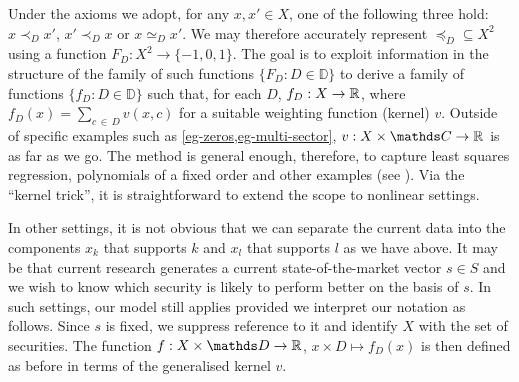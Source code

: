 \documentclass[12pt,a4paper,twoside]{article}
\newcommand{\preceqb}{\mathbin{\preceq}}
\newcommand{\mbbd}{{\mathds D}}
\newcommand{\mbbc}{{\mathds C}}
\begin{document}

Under the axioms we adopt, for any $x, x' \in X$, one of the following three
hold: $x \prec_D x'$, $x' \prec_D x$ or $x \simeq_D x'$. We may therefore
accurately represent $\preceqb_D \subseteq X^2$ using a function $F_D: X^2
\rightarrow \{-1, 0, 1\}$. The goal is to exploit information in the structure
of the family of such functions $\{F_D: D \in \mbbd\}$ to derive a family of
functions $\{f_D: D \in \mbbd\}$ such that, for each $D$, $f_D: X \rightarrow
\mathbb R$, where $f_D(x) = \sum_{c\, \in \,D} v(x, c)$ for a suitable weighting
function (kernel) $v$. Outside of specific examples such as
\cref{eg-zeros,eg-multi-sector}, $v: X \times \mbbc \rightarrow \R$ is as far
as we go. The method is general enough, therefore, to capture least squares
regression, polynomials of a fixed order and other examples (see \citet[page
10]{Cucker-Smale}). Via the ``kernel trick'', it is straightforward to extend
the scope to nonlinear settings.

In other settings, it is not obvious that we can separate the current data into
the components $x_k$ that supports $k$ and $x_l$ that supports $l$ as we have
above. It may be that current research generates a current state-of-the-market
vector $s \in S$ and we wish to know which security is likely to perform better
on the basis of $s$. In such settings, our model still applies provided we
interpret our notation as follows. Since $s$ is fixed, we suppress reference to
it and identify $X$ with the set of securities. The function $f: X \times \mbbd
\rightarrow \R$, $x \times D \mapsto f_D(x)$ is then defined as before in terms
of the generalised kernel $v$. 
\end{document}
